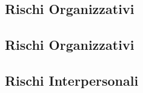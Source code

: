    \subsection{Rischi Organizzativi}
   \subsection{Rischi Organizzativi}
   \subsection{Rischi Interpersonali}
